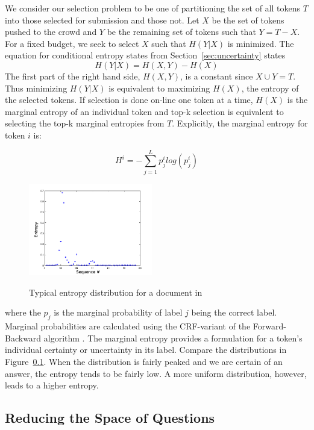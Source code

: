 We consider our selection problem to be one of partitioning the set of all tokens $T$ into those selected for submission and those not.  Let $X$ be the set of tokens pushed to the crowd and $Y$ be the remaining set of tokens such that $Y = T - X$. For a fixed budget, we seek to select $X$ such that $H(Y|X)$ is minimized.  The equation for conditional entropy states from Section~\ref{sec:uncertainty} states
\begin{equation}
H(Y|X) = H(X,Y) - H(X)
\end{equation}
The first part of the right hand side, $H(X,Y)$, is a constant since $X \cup Y = T$.  Thus minimizing $H(Y|X)$ is equivalent to maximizing $H(X)$, the entropy of the selected tokens.  If selection is done on-line one token at a time, $H(X)$ is the marginal entropy of an individual token and top-k selection is equivalent to selecting the top-k marginal entropies from $T$.  Explicitly, the marginal entropy for token $i$ is:

\begin{equation}
H^{i} = -\sum^{L}_{j=1}p^{i}_{j}log(p^{i}_{j})
\end{equation}

\begin{figure}
		\includegraphics[width=0.48\textwidth]{images/ent_dist1.png}
		\label{fig:ent_dist}
		\caption{Typical entropy distribution for a document in \sysName} 
\end{figure}

where the $p_{j}$ is the marginal probability of label $j$ being the correct label.  Marginal probabilities are calculated using the CRF-variant of the Forward-Backward algorithm \cite{}.  The marginal entropy provides a formulation for a token's individual certainty or uncertainty in its label.  Compare the distributions in Figure~\ref{}.  When the distribution is fairly peaked and we are certain of an answer, the entropy tends to be fairly low.  A more uniform distribution, however, leads to a higher entropy.

\subsection{Reducing the Space of Questions}
